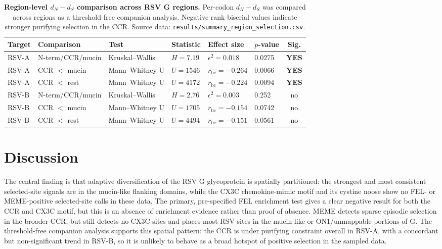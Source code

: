 \documentclass[11pt]{article}
\newcommand{\dndsdiff}{\ensuremath{d_N-d_S}}
\newcommand{\rbc}{\ensuremath{r_{\mathrm{bc}}}}
\newcommand{\yes}{\textbf{YES}}
\begin{document}
\begin{table}[H]
\centering
\scriptsize
\setlength{\tabcolsep}{4pt}
\caption{\textbf{Region-level $d_N-d_S$ comparison across RSV G regions.} Per-codon \dndsdiff{} was compared across regions as a threshold-free companion analysis. Negative rank-biserial values indicate stronger purifying selection in the CCR. Source data: \texttt{results/summary\_region\_selection.csv}.}
\label{tab:region_selection}
\begin{tabular}{llllllc}
\toprule
Target & Comparison & Test & Statistic & Effect size & $p$-value & Sig. \\
\midrule
RSV-A & N-term/CCR/mucin & Kruskal--Wallis & $H=7.19$ & $\epsilon^2=0.018$ & 0.0275 & \yes \\
RSV-A & CCR $<$ mucin & Mann--Whitney U & $U=1546$ & $\rbc=-0.264$ & 0.0066 & \yes \\
RSV-A & CCR $<$ rest & Mann--Whitney U & $U=4172$ & $\rbc=-0.224$ & 0.0094 & \yes \\
RSV-B & N-term/CCR/mucin & Kruskal--Wallis & $H=2.76$ & $\epsilon^2=0.003$ & 0.252 & no \\
RSV-B & CCR $<$ mucin & Mann--Whitney U & $U=1705$ & $\rbc=-0.154$ & 0.0742 & no \\
RSV-B & CCR $<$ rest & Mann--Whitney U & $U=4494$ & $\rbc=-0.151$ & 0.0561 & no \\
\bottomrule
\end{tabular}
\end{table}

\section{Discussion}

The central finding is that adaptive diversification of the RSV G glycoprotein is spatially partitioned: the strongest and most consistent selected-site signals are in the mucin-like flanking domains, while the CX3C chemokine-mimic motif and its cystine noose show no FEL- or MEME-positive selected-site calls in these data. The primary, pre-specified FEL enrichment test gives a clear negative result for both the CCR and CX3C motif, but this is an absence of enrichment evidence rather than proof of absence. MEME detects sparse episodic selection in the broader CCR, but still detects no CX3C sites and places most RSV sites in the mucin-like or ON1/unmappable portions of G. The threshold-free companion analysis supports this spatial pattern: the CCR is under purifying constraint overall in RSV-A, with a concordant but non-significant trend in RSV-B, so it is unlikely to behave as a broad hotspot of positive selection in the sampled data.
\end{document}
